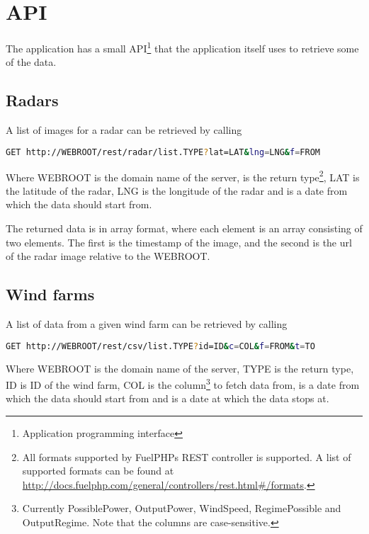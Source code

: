 \section{API}
\label{sec:api}
The application has a small API\footnote{Application programming interface} that the application itself uses to retrieve some of the data.

\subsection{Radars}
\label{sec:api_radars}
A list of images for a radar can be retrieved by calling
\begin{lstlisting}[language=sh,caption={Url for retrieving images for a radar}]
GET http://WEBROOT/rest/radar/list.TYPE?lat=LAT&lng=LNG&f=FROM
\end{lstlisting}
Where \textsf{WEBROOT} is the domain name of the server,  is the return type\footnote{All formats supported by FuelPHPs REST controller is supported. A list of supported formats can be found at \url{http://docs.fuelphp.com/general/controllers/rest.html\#/formats}.\label{fn:fuel_rest}}, \textsf{LAT} is the latitude of the radar, \textsf{LNG} is the longitude of the radar and  is a date from which the data should start from.

The returned data is in array format, where each element is an array consisting of two elements. The first is the timestamp of the image, and the second is the url of the radar image relative to the \textsf{WEBROOT}.

\subsection{Wind farms}
\label{sec:api_wind_farms}
A list of data from a given wind farm can be retrieved by calling
\begin{lstlisting}[language=sh,caption={Url for retrieving data for a wind farm}]
GET http://WEBROOT/rest/csv/list.TYPE?id=ID&c=COL&f=FROM&t=TO
\end{lstlisting}
Where \textsf{WEBROOT} is the domain name of the server, \textsf{TYPE} is the return type, \textsf{ID} is ID of the wind farm, \textsf{COL} is the column\footnote{Currently \textsf{PossiblePower}, \textsf{OutputPower}, \textsf{WindSpeed}, \textsf{RegimePossible} and \textsf{OutputRegime}. Note that the columns are case-sensitive.} to fetch data from,  is a date from which the data should start from and  is a date at which the data stops at.

